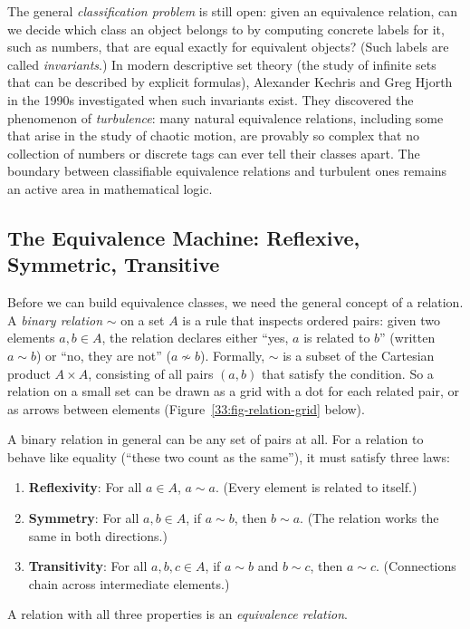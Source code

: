 \begin{historybox}
The general \emph{classification problem} is still open: given an equivalence relation, can we decide which class an object belongs to by computing concrete labels for it, such as numbers, that are equal exactly for equivalent objects? (Such labels are called \emph{invariants}.) In modern descriptive set theory (the study of infinite sets that can be described by explicit formulas), Alexander Kechris and Greg Hjorth in the 1990s investigated when such invariants exist. They discovered the phenomenon of \emph{turbulence}: many natural equivalence relations, including some that arise in the study of chaotic motion, are provably so complex that no collection of numbers or discrete tags can ever tell their classes apart. The boundary between classifiable equivalence relations and turbulent ones remains an active area in mathematical logic.
\end{historybox}

\subsection{The Equivalence Machine: Reflexive, Symmetric, Transitive}

Before we can build equivalence classes, we need the general concept of a relation. A \emph{binary relation} $\sim$ on a set $A$ is a rule that inspects ordered pairs: given two elements $a, b \in A$, the relation declares either ``yes, $a$ is related to $b$'' (written $a \sim b$) or ``no, they are not'' ($a \nsim b$). Formally, $\sim$ is a subset of the Cartesian product $A \times A$, consisting of all pairs $(a, b)$ that satisfy the condition. So a relation on a small set can be drawn as a grid with a dot for each related pair, or as arrows between elements (Figure~\ref{33:fig-relation-grid} below).

A binary relation in general can be any set of pairs at all. For a relation to behave like equality (``these two count as the same''), it must satisfy three laws:
\begin{enumerate}
  \item \textbf{Reflexivity}: For all $a \in A$, $a \sim a$. (Every element is related to itself.)
  \item \textbf{Symmetry}: For all $a, b \in A$, if $a \sim b$, then $b \sim a$. (The relation works the same in both directions.)
  \item \textbf{Transitivity}: For all $a, b, c \in A$, if $a \sim b$ and $b \sim c$, then $a \sim c$. (Connections chain across intermediate elements.)
\end{enumerate}
A relation with all three properties is an \emph{equivalence relation}.


